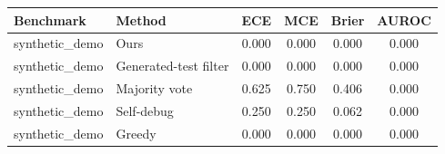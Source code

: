 \begin{tabular}{llcccc}
\toprule
Benchmark & Method & ECE & MCE & Brier & AUROC \\
\midrule
synthetic_demo & Ours & 0.000 & 0.000 & 0.000 & 0.000 \\
synthetic_demo & Generated-test filter & 0.000 & 0.000 & 0.000 & 0.000 \\
synthetic_demo & Majority vote & 0.625 & 0.750 & 0.406 & 0.000 \\
synthetic_demo & Self-debug & 0.250 & 0.250 & 0.062 & 0.000 \\
synthetic_demo & Greedy & 0.000 & 0.000 & 0.000 & 0.000 \\
\bottomrule
\end{tabular}
